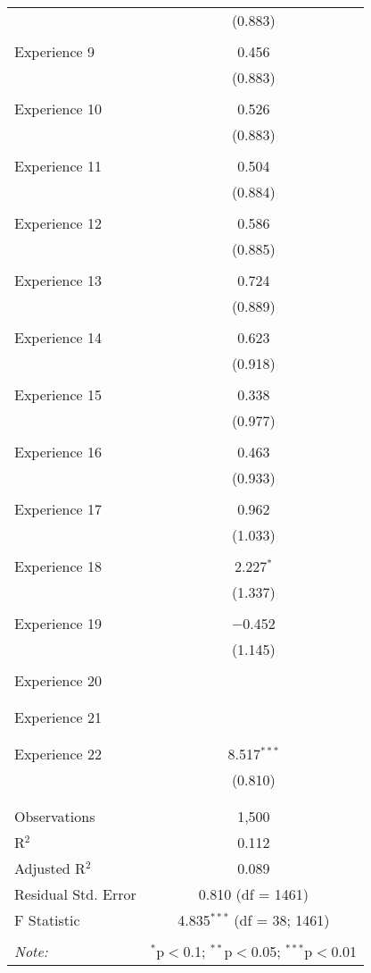 \begin{table}[!htbp]
\begin{tabular}{@{\extracolsep{5pt}}lc}
  & (0.883) \\ 
  & \\ 
 Experience 9 & 0.456 \\ 
  & (0.883) \\ 
  & \\ 
 Experience 10 & 0.526 \\ 
  & (0.883) \\ 
  & \\ 
 Experience 11 & 0.504 \\ 
  & (0.884) \\ 
  & \\ 
 Experience 12 & 0.586 \\ 
  & (0.885) \\ 
  & \\ 
 Experience 13 & 0.724 \\ 
  & (0.889) \\ 
  & \\ 
 Experience 14 & 0.623 \\ 
  & (0.918) \\ 
  & \\ 
 Experience 15 & 0.338 \\ 
  & (0.977) \\ 
  & \\ 
 Experience 16 & 0.463 \\ 
  & (0.933) \\ 
  & \\ 
 Experience 17 & 0.962 \\ 
  & (1.033) \\ 
  & \\ 
 Experience 18 & 2.227$^{*}$ \\ 
  & (1.337) \\ 
  & \\ 
 Experience 19 & $-$0.452 \\ 
  & (1.145) \\ 
  & \\ 
 Experience 20 &  \\ 
  &  \\ 
  & \\ 
 Experience 21 &  \\ 
  &  \\ 
  & \\ 
 Experience 22 & 8.517$^{***}$ \\ 
  & (0.810) \\ 
  & \\ 
\hline \\[-1.8ex] 
Observations & 1,500 \\ 
R$^{2}$ & 0.112 \\ 
Adjusted R$^{2}$ & 0.089 \\ 
Residual Std. Error & 0.810 (df = 1461) \\ 
F Statistic & 4.835$^{***}$ (df = 38; 1461) \\ 
\hline 
\hline \\[-1.8ex] 
\textit{Note:}  & \multicolumn{1}{r}{$^{*}$p$<$0.1; $^{**}$p$<$0.05; $^{***}$p$<$0.01} \\ 
\end{tabular} 
\end{table} 
